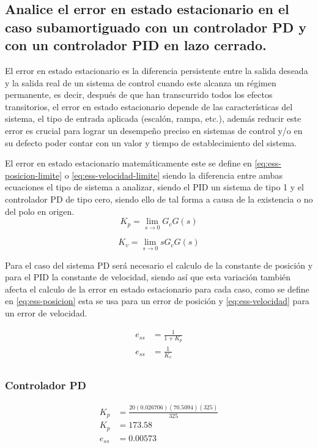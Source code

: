 \documentclass[conference]{IEEEtran}
\begin{document}
	\subsection{\textbf{Analice el error en estado estacionario en el caso subamortiguado con un controlador PD y con un controlador PID en lazo cerrado.}}
	
	El error en estado estacionario es la diferencia persistente entre la salida deseada y la salida real de un sistema de control cuando este alcanza un régimen permanente, es decir, después de que han transcurrido todos los efectos transitorios, el error en estado estacionario depende de las características del sistema, el tipo de entrada aplicada (escalón, rampa, etc.), además reducir este error es crucial para lograr un desempeño preciso en sistemas de control y/o en su defecto poder contar con un valor y tiempo de establecimiento del sistema.
	
	El error en estado estacionario matemáticamente este se define en \ref{eq:ess-posicion-limite} o \ref{eq:ess-velocidad-limite} siendo la diferencia entre ambas ecuaciones el tipo de sistema a analizar, siendo el PID un sistema de tipo 1 y el controlador PD de tipo cero, siendo ello de tal forma a causa de la existencia o no del polo en origen.
	\begin{equation}
		K_p = \lim_{s \to 0} G_c G(s)
		\label{eq:ess-posicion-limite}
	\end{equation}
	
	\begin{equation}
		K_v = \lim_{s \to 0} sG_c G(s)
		\label{eq:ess-velocidad-limite}
	\end{equation}
	
	Para el caso del sistema PD será necesario el calculo de la constante de posición y para el PID la constante de velocidad, siendo así que esta variación también afecta el calculo de la error en estado estacionario para cada caso, como se define en \ref{eq:ess-posicion} esta se usa para un error de posición y \ref{eq:ess-velocidad} para un error de velocidad.
	
	\begin{align}
		e_{ss} &= \frac{1}{1 + K_p} \\
		\label{eq:ess-posicion}
		e_{ss} &= \frac{1}{K_v} \\
		\label{eq:ess-velocidad}
	\end{align}
	
	\subsubsection{Controlador PD}
	\begin{align}
		K_p &= \frac{20(0.026706)(70.5094)(325)}{325} \\
		K_p &= 173.58 \\
		e_{ss} &= 0.00573
	\end{align}
\end{document}
